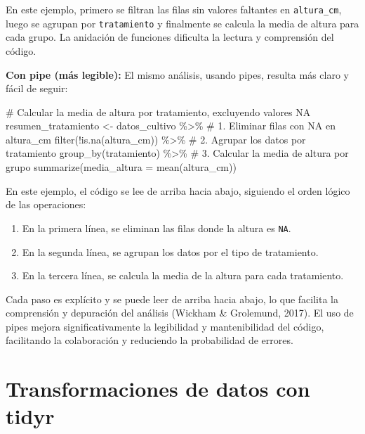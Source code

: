 \documentclass[
  spanish,
  a4paper,
  DIV=11,
  numbers=noendperiod,
  onepage,
  openany]{scrreprt}
\newenvironment{Shaded}{\begin{snugshade}}{\end{snugshade}}
\newcommand{\AttributeTok}[1]{\textcolor[rgb]{0.40,0.45,0.13}{#1}}
\newcommand{\CommentTok}[1]{\textcolor[rgb]{0.37,0.37,0.37}{#1}}
\newcommand{\FunctionTok}[1]{\textcolor[rgb]{0.28,0.35,0.67}{#1}}
\newcommand{\NormalTok}[1]{\textcolor[rgb]{0.00,0.23,0.31}{#1}}
\newcommand{\OtherTok}[1]{\textcolor[rgb]{0.00,0.23,0.31}{#1}}
\newcommand{\SpecialCharTok}[1]{\textcolor[rgb]{0.37,0.37,0.37}{#1}}
\begin{document}
En este ejemplo, primero se filtran las filas sin valores faltantes en
\texttt{altura\_cm}, luego se agrupan por \texttt{tratamiento} y
finalmente se calcula la media de altura para cada grupo. La anidación
de funciones dificulta la lectura y comprensión del código.

\textbf{Con pipe (más legible):} El mismo análisis, usando pipes,
resulta más claro y fácil de seguir:

\begin{Shaded}
\begin{Highlighting}[]
\CommentTok{\# Calcular la media de altura por tratamiento, excluyendo valores NA}
\NormalTok{resumen\_tratamiento }\OtherTok{\textless{}{-}}\NormalTok{ datos\_cultivo }\SpecialCharTok{\%\textgreater{}\%}
    \CommentTok{\# 1. Eliminar filas con NA en altura\_cm}
    \FunctionTok{filter}\NormalTok{(}\SpecialCharTok{!}\FunctionTok{is.na}\NormalTok{(altura\_cm)) }\SpecialCharTok{\%\textgreater{}\%}    
    \CommentTok{\# 2. Agrupar los datos por tratamiento}
    \FunctionTok{group\_by}\NormalTok{(tratamiento) }\SpecialCharTok{\%\textgreater{}\%}    
    \CommentTok{\# 3. Calcular la media de altura por grupo}
    \FunctionTok{summarize}\NormalTok{(}\AttributeTok{media\_altura =} \FunctionTok{mean}\NormalTok{(altura\_cm))}
\end{Highlighting}
\end{Shaded}

En este ejemplo, el código se lee de arriba hacia abajo, siguiendo el
orden lógico de las operaciones:

\begin{enumerate}
\def\labelenumi{\arabic{enumi}.}
\item
  En la primera línea, se eliminan las filas donde la altura es
  \texttt{NA}.
\item
  En la segunda línea, se agrupan los datos por el tipo de tratamiento.
\item
  En la tercera línea, se calcula la media de la altura para cada
  tratamiento.
\end{enumerate}

Cada paso es explícito y se puede leer de arriba hacia abajo, lo que
facilita la comprensión y depuración del análisis (Wickham \& Grolemund,
2017). El uso de pipes mejora significativamente la legibilidad y
mantenibilidad del código, facilitando la colaboración y reduciendo la
probabilidad de errores.

\section{Transformaciones de datos con
tidyr}\label{transformaciones-de-datos-con-tidyr}
\end{document}

